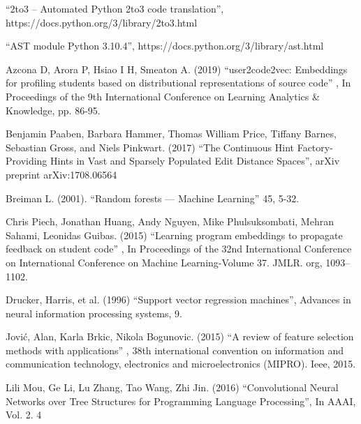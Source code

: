 \documentclass[a4paper, 14pt, oneside]{Thesis}
\begin{document}
\begin{spacing}{1.5}
%




\end{spacing}
\newpage
\appendix
% 
%
%
\begin{thebibliography}{99}
  
  
 ``2to3 -- Automated Python 2to3 code translation'', https://docs.python.org/3/library/2to3.html 

 ``AST module Python 3.10.4'', https://docs.python.org/3/library/ast.html
  
 Azcona D, Arora P, Hsiao I H, Smeaton
  A. (2019) ``user2code2vec: Embeddings for profiling students
  based on distributional representations of source code'' ,
  In Proceedings of the 9th International Conference on
  Learning Analytics \& Knowledge, pp. 86-95.

 Benjamin Paaben, Barbara Hammer, Thomas
  William Price, Tiffany Barnes, Sebastian Gross, and Niels
  Pinkwart. (2017) ``The Continuous Hint Factory-Providing
  Hints in Vast and Sparsely Populated Edit Distance Spaces'',
  arXiv preprint arXiv:1708.06564

 Breiman L. (2001). ``Random forests --- Machine
  Learning'' 45, 5-32.

 Chris Piech, Jonathan Huang, Andy Nguyen, Mike
  Phulsuksombati, Mehran Sahami, Leonidas Guibas. (2015)
  ``Learning program embeddings to propagate feedback on
  student code'' , In Proceedings of the 32nd International
  Conference on International Conference on Machine
  Learning-Volume 37. JMLR. org, 1093–1102.

 Drucker, Harris, et al. (1996) ``Support
  vector regression machines'', Advances in neural
  information processing systems, 9.

 Jović, Alan, Karla Brkic, Nikola
  Bogunovic. (2015) ``A review of feature selection methods
  with applications'' , 38th international convention on
  information and communication technology, electronics and
  microelectronics (MIPRO). Ieee, 2015.

 Lili Mou, Ge Li, Lu Zhang, Tao Wang, Zhi
  Jin. (2016) ``Convolutional Neural Networks over Tree
  Structures for Programming Language Processing'', In AAAI,
  Vol. 2. 4


\end{thebibliography}
\end{document}
